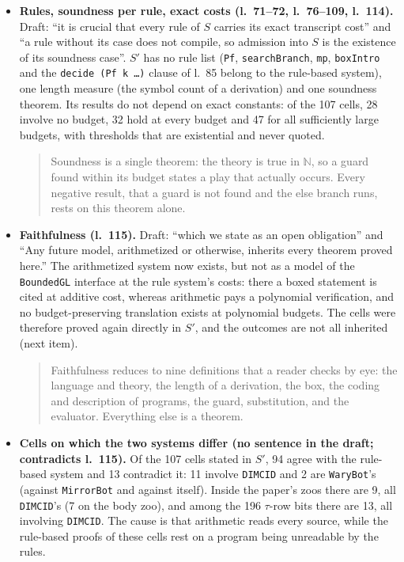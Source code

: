 \begin{itemize}
\begin{quote}
$\Box_k\varphi$ is the arithmetical formula ``some derivation of $\varphi$ in the theory has at most $k$ symbols'', which the guard of a program mentions; $\vdash_k\varphi$ states that this formula is true, that is, that such a derivation exists; $\models\varphi$ is the truth of $\varphi$ in $\mathbb{N}$.
\end{quote}
\item \textbf{Rules, soundness per rule, exact costs (l.~71--72, l.~76--109, l.~114).} Draft: ``it is crucial that every rule of $S$ carries its exact transcript cost'' and ``a rule without its case does not compile, so admission into $S$ is the existence of its soundness case''. $S'$ has no rule list (\texttt{Pf}, \texttt{searchBranch}, \texttt{mp}, \texttt{boxIntro} and the \texttt{decide (Pf k \ldots)} clause of l.~85 belong to the rule-based system), one length measure (the symbol count of a derivation) and one soundness theorem. Its results do not depend on exact constants: of the 107 cells, 28 involve no budget, 32 hold at every budget and 47 for all sufficiently large budgets, with thresholds that are existential and never quoted.
\begin{quote}
Soundness is a single theorem: the theory is true in $\mathbb{N}$, so a guard found within its budget states a play that actually occurs. Every negative result, that a guard is not found and the else branch runs, rests on this theorem alone.
\end{quote}
\item \textbf{Faithfulness (l.~115).} Draft: ``which we state as an open obligation'' and ``Any future model, arithmetized or otherwise, inherits every theorem proved here.'' The arithmetized system now exists, but not as a model of the \texttt{BoundedGL} interface at the rule system's costs: there a boxed statement is cited at additive cost, whereas arithmetic pays a polynomial verification, and no budget-preserving translation exists at polynomial budgets. The cells were therefore proved again directly in $S'$, and the outcomes are not all inherited (next item).
\begin{quote}
Faithfulness reduces to nine definitions that a reader checks by eye: the language and theory, the length of a derivation, the box, the coding and description of programs, the guard, substitution, and the evaluator. Everything else is a theorem.
\end{quote}
\item \textbf{Cells on which the two systems differ (no sentence in the draft; contradicts l.~115).} Of the 107 cells stated in $S'$, 94 agree with the rule-based system and 13 contradict it: 11 involve \texttt{DIMCID} and 2 are \texttt{WaryBot}'s (against \texttt{MirrorBot} and against itself). Inside the paper's zoos there are 9, all \texttt{DIMCID}'s (7 on the body zoo), and among the 196 $\tau$-row bits there are 13, all involving \texttt{DIMCID}. The cause is that arithmetic reads every source, while the rule-based proofs of these cells rest on a program being unreadable by the rules.

\end{itemize}
